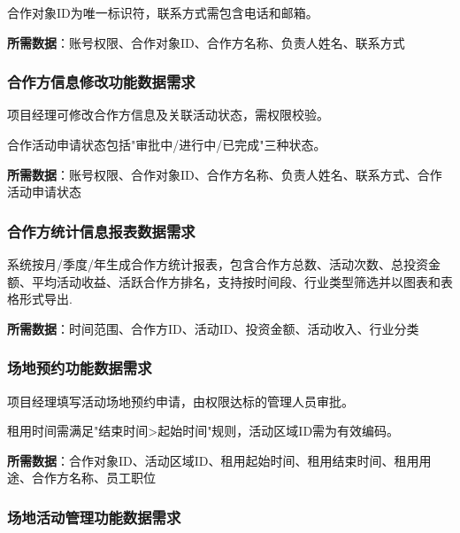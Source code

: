 \documentclass[]{article}
\begin{document}
合作对象ID为唯一标识符，联系方式需包含电话和邮箱。

\textbf{所需数据}：账号权限、合作对象ID、合作方名称、负责人姓名、联系方式

\hypertarget{ux5408ux4f5cux65b9ux4fe1ux606fux4feeux6539ux529fux80fdux6570ux636eux9700ux6c42}{%
\subsubsection{合作方信息修改功能数据需求}\label{ux5408ux4f5cux65b9ux4fe1ux606fux4feeux6539ux529fux80fdux6570ux636eux9700ux6c42}}

项目经理可修改合作方信息及关联活动状态，需权限校验。

合作活动申请状态包括"审批中/进行中/已完成"三种状态。

\textbf{所需数据}：账号权限、合作对象ID、合作方名称、负责人姓名、联系方式、合作活动申请状态

\hypertarget{ux5408ux4f5cux65b9ux7edfux8ba1ux4fe1ux606fux62a5ux8868ux6570ux636eux9700ux6c42}{%
\subsubsection{合作方统计信息报表数据需求}\label{ux5408ux4f5cux65b9ux7edfux8ba1ux4fe1ux606fux62a5ux8868ux6570ux636eux9700ux6c42}}

系统按月/季度/年生成合作方统计报表，包含合作方总数、活动次数、总投资金额、平均活动收益、活跃合作方排名，支持按时间段、行业类型筛选并以图表和表格形式导出.

\textbf{所需数据}：时间范围、合作方ID、活动ID、投资金额、活动收入、行业分类

\hypertarget{ux573aux5730ux9884ux7ea6ux529fux80fdux6570ux636eux9700ux6c42}{%
\subsubsection{场地预约功能数据需求}\label{ux573aux5730ux9884ux7ea6ux529fux80fdux6570ux636eux9700ux6c42}}

项目经理填写活动场地预约申请，由权限达标的管理人员审批。

租用时间需满足"结束时间\textgreater{}起始时间"规则，活动区域ID需为有效编码。

\textbf{所需数据}：合作对象ID、活动区域ID、租用起始时间、租用结束时间、租用用途、合作方名称、员工职位

\hypertarget{ux573aux5730ux6d3bux52a8ux7ba1ux7406ux529fux80fdux6570ux636eux9700ux6c42}{%
\subsubsection{场地活动管理功能数据需求}\label{ux573aux5730ux6d3bux52a8ux7ba1ux7406ux529fux80fdux6570ux636eux9700ux6c42}}
\end{document}
